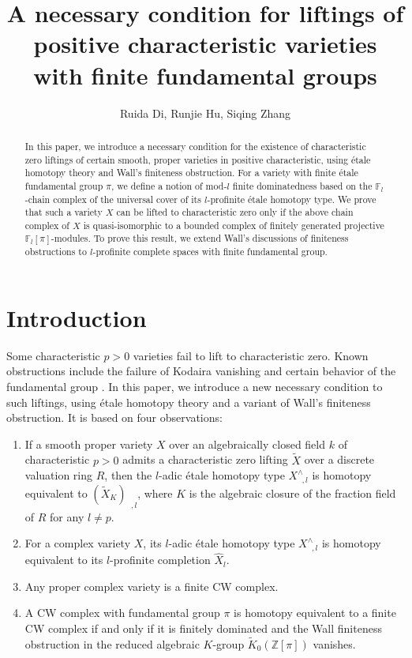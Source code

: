 \documentclass[11pt]{amsart}
\author{Ruida Di, Runjie Hu, Siqing Zhang}
\title{A necessary condition for liftings of positive characteristic varieties with finite fundamental groups}
\theoremstyle{definition}
\numberwithin{equation}{section}
\numberwithin{equation}{section}
\newcommand\ZZ{\mathbb{Z}}
\newcommand\FF{\mathbb{F}}
\DeclareMathOperator{\et}{\acute{e}t}
\begin{document}
\maketitle

\begin{abstract}
In this paper, we introduce a necessary condition for the existence of characteristic zero liftings of certain smooth, proper varieties in positive characteristic, using étale homotopy theory and Wall's finiteness obstruction. For a variety with finite étale fundamental group $\pi$, we define a notion of mod-$l$ finite dominatedness based on the $\FF_l$-chain complex of the universal cover of its $l$-profinite étale homotopy type. We prove that such a variety $X$ can be lifted to characteristic zero only if the above chain complex of $X$ is quasi-isomorphic to a bounded complex of finitely generated projective $\FF_l [\pi]$-modules. To prove this result, we extend Wall's discussions of finiteness obstructions to $l$-profinite complete spaces with finite fundamental group.
\end{abstract}

\section{Introduction}

Some characteristic $p>0$ varieties fail to lift to characteristic zero. Known obstructions include the failure of Kodaira vanishing and certain behavior of the fundamental group \cite{esnault2021obstruction, haboush1993varieties, totaro2019failure}. In this paper, we introduce a new necessary condition to such liftings, using étale homotopy theory and a variant of Wall’s finiteness obstruction. It is based on four observations:
\begin{enumerate}
    \item If a smooth proper variety $X$ over an algebraically closed field $k$ of characteristic $p>0$ admits a characteristic zero lifting $\widetilde{X}$ over a discrete valuation ring $R$, then the $l$-adic \'etale homotopy type $X^{\wedge}_{\et,l}$ is homotopy equivalent to $(\widetilde{X}_K)_{\et,l}$, where $K$ is the algebraic closure of the fraction field of $R$ for any $l\neq p$.
    \item For a complex variety $X$, its $l$-adic \'etale homotopy type $X^{\wedge}_{\et,l}$ is homotopy equivalent to its $l$-profinite completion $\widehat{X}_l$.
    \item Any proper complex variety is a finite CW complex.
    \item A CW complex with fundamental group $\pi$ is homotopy equivalent to a finite CW complex if and only if it is finitely dominated and the Wall finiteness obstruction in the reduced algebraic $K$-group $\widetilde{K}_0(\ZZ [\pi])$ vanishes.
\end{enumerate}
\end{document}
